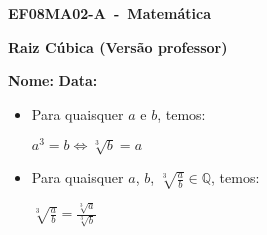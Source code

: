 \documentclass[a4paper,14pt]{article}
\begin{document}
	
	\noindent\textbf{EF08MA02-A~-~Matemática} 
	
	\begin{center}
		\textbf{Raiz Cúbica (Versão professor)}
	\end{center}
	
	\bigskip
	
	\noindent\textbf{Nome:} \underline{\hspace{10cm}}
    \noindent\textbf{Data:} \underline{\hspace{4cm}}
	
	\bigskip
	
	\begin{multicols}{2}
	\begin{itemize}
		\item Para quaisquer $a$ e $b$, temos:
		\begin{center}
			$a^3 = b \Leftrightarrow \sqrt[3]{b} = a$
		\end{center}
	    \item Para quaisquer $a$, $b$, $\sqrt[3]{\frac{a}{b}} \in \mathbb{Q}$, temos:
	    \begin{center}
	    	$\sqrt[3]{\frac{a}{b}} = \frac{\sqrt[3]{a}}{\sqrt[3]{b}}$
	    \end{center}  
	\end{itemize}
	\begin{enumerate}
		

\end{enumerate}
\end{multicols}
\end{document}

